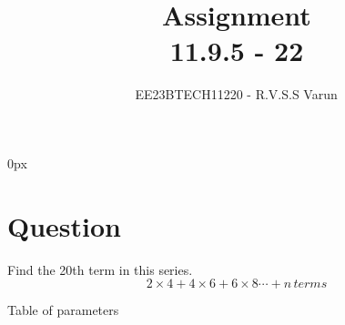 \documentclass[beamer]{IEEEtran}
\theoremstyle{remark}
\begin{document}
\parindent 0px


\title{Assignment\\[1ex]11.9.5 - 22}
\author{EE23BTECH11220 - R.V.S.S Varun$^{}$%
}
\maketitle
\newpage
\bigskip

\renewcommand{\thefigure}{\theenumi}
\renewcommand{\thetable}{\theenumi}
\section*{Question}
Find the 20th term in this series.\\
$$2\times4+4\times6+6\times8\cdots+n\,terms$$ 


\solution

\begin{table}[h]
    \centering
    
    \caption{Table of parameters}
    \label{tab:11.9.5.22.1}
\end{table}
\end{document}
